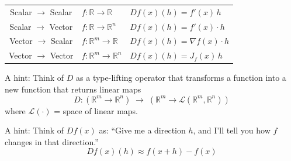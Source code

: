 \vspace{5mm}

\begin{center}
  \begin{tabular}{ c l l }
    Scalar $\to$ Scalar & $f : \mathbb{R} \to \mathbb{R}$     & $Df(x)(h) = f'(x)\,h$ \\
    Scalar $\to$ Vector & $f : \mathbb{R} \to \mathbb{R}^n$   & $Df(x)(h) = f'(x) \cdot h$ \\
    Vector $\to$ Scalar & $f : \mathbb{R}^m \to \mathbb{R}$   & $Df(x)(h) = \nabla f(x) \cdot h$ \\
    Vector $\to$ Vector & $f : \mathbb{R}^m \to \mathbb{R}^n$ & $Df(x)(h) = J_f(x)\,h$
  \end{tabular}
\end{center}

\vspace{5mm}

A hint: Think of $D$ as a type-lifting operator that transforms a function into a new function that returns linear maps
\[ D : ( \mathbb{R}^m \to \mathbb{R}^n ) \;\to\; ( \mathbb{R}^m \to \mathcal{L}(\mathbb{R}^m, \mathbb{R}^n) ) \]
where $\mathcal{L}(\cdot)$ = space of linear maps.

\vspace{5mm}

A hint: Think of $Df(x)$ as: ``Give me a direction $h$, and I'll tell you how $f$ changes in that direction.''
\[ Df(x)(h) \approx f(x + h) - f(x) \]
